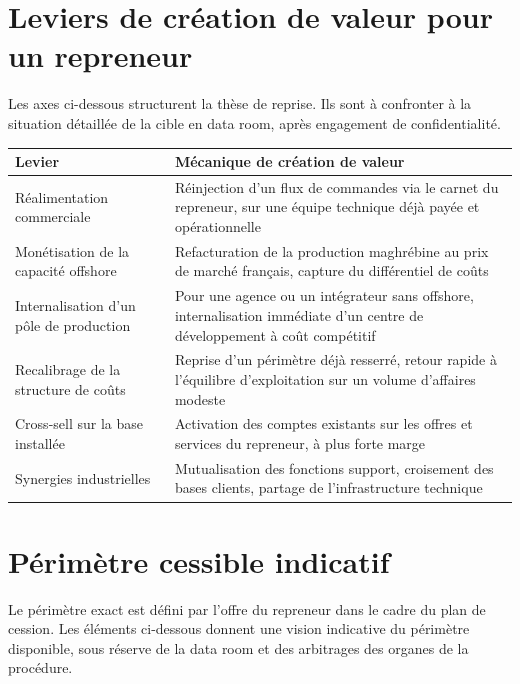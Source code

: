 \documentclass[11pt,a4paper]{article}
\begin{document}
\section{Leviers de création de valeur pour un repreneur}

Les axes ci-dessous structurent la thèse de reprise. Ils sont à confronter à la situation détaillée de la cible en data room, après engagement de confidentialité.

\begin{longtable}{L{5.5cm}L{9.5cm}}
\toprule
\textbf{Levier} & \textbf{Mécanique de création de valeur} \\
\midrule
\endhead
Réalimentation commerciale & Réinjection d'un flux de commandes via le carnet du repreneur, sur une équipe technique déjà payée et opérationnelle \\
Monétisation de la capacité offshore & Refacturation de la production maghrébine au prix de marché français, capture du différentiel de coûts \\
Internalisation d'un pôle de production & Pour une agence ou un intégrateur sans offshore, internalisation immédiate d'un centre de développement à coût compétitif \\
Recalibrage de la structure de coûts & Reprise d'un périmètre déjà resserré, retour rapide à l'équilibre d'exploitation sur un volume d'affaires modeste \\
Cross-sell sur la base installée & Activation des comptes existants sur les offres et services du repreneur, à plus forte marge \\
Synergies industrielles & Mutualisation des fonctions support, croisement des bases clients, partage de l'infrastructure technique \\
\bottomrule
\end{longtable}

\section{Périmètre cessible indicatif}

Le périmètre exact est défini par l'offre du repreneur dans le cadre du plan de cession. Les éléments ci-dessous donnent une vision indicative du périmètre disponible, sous réserve de la data room et des arbitrages des organes de la procédure.
\end{document}
